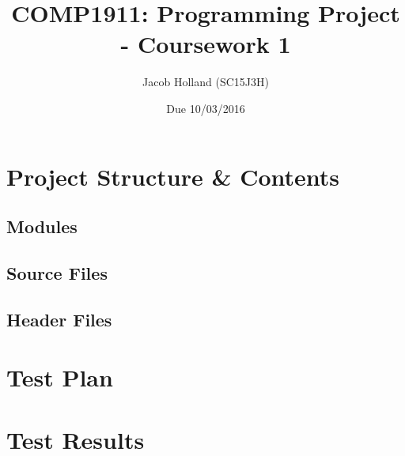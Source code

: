 \documentclass{article}
\title{\vspace{-4cm}COMP1911: Programming Project - Coursework 1}
\author{Jacob Holland (SC15J3H)}
\date{Due 10/03/2016}
\begin{document}
	\maketitle
	\tableofcontents
	\section{Project Structure \& Contents}
	\subsection{Modules}
	\subsection{Source Files}
	\subsection{Header Files}
	\section{Test Plan}
	\section{Test Results}
\end{document}
